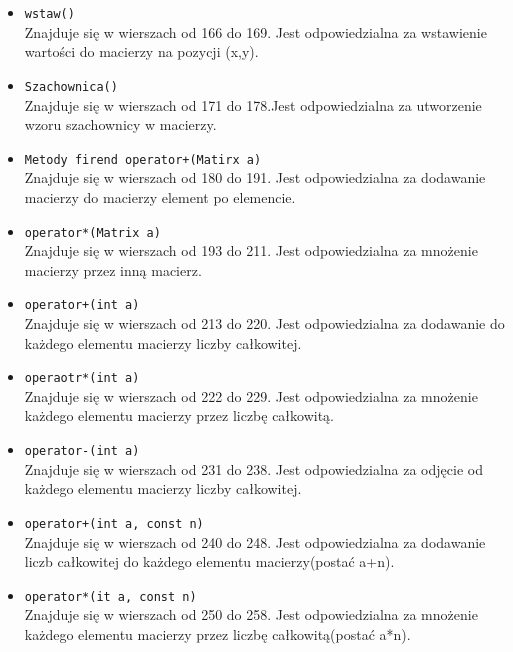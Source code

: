 \begin{itemize}
    \item \texttt{wstaw()}\\
    Znajduje się w wierszach od 166 do 169.
    Jest odpowiedzialna za wstawienie wartości do macierzy na pozycji (x,y).
    
    \item \texttt{Szachownica()}\\
    Znajduje się w wierszach od 171 do 178.Jest odpowiedzialna za utworzenie wzoru szachownicy w macierzy.
    
    \item \texttt{Metody firend operator+(Matirx a)}\\
    Znajduje się w wierszach od 180 do 191. Jest odpowiedzialna za dodawanie macierzy do macierzy element po elemencie.
    
    \item \texttt{operator*(Matrix a)}\\
    Znajduje się w wierszach od 193 do 211.
    Jest odpowiedzialna za mnożenie macierzy przez inną macierz.
    
    \item \texttt{operator+(int a)}\\
    Znajduje się w wierszach od 213 do 220.
    Jest odpowiedzialna za dodawanie do każdego elementu macierzy liczby całkowitej.
    
    \item \texttt{operaotr*(int a)}\\
    Znajduje się w wierszach od 222 do 229.
    Jest odpowiedzialna za mnożenie każdego elementu macierzy przez liczbę całkowitą.
    
    \item \texttt{operator-(int a)}\\
    Znajduje się w wierszach od 231 do 238.
    Jest odpowiedzialna za odjęcie od każdego elementu macierzy liczby całkowitej.
    
    \item \texttt{operator+(int a, const n)}\\
    Znajduje się w wierszach od 240 do 248.
    Jest odpowiedzialna za dodawanie liczb całkowitej do każdego elementu macierzy(postać a+n).
    
    \item \texttt{operator*(it a, const n)}\\
    Znajduje się w wierszach od 250 do 258.
    Jest odpowiedzialna za mnożenie każdego elementu macierzy przez liczbę całkowitą(postać a*n).
    

\end{itemize}
